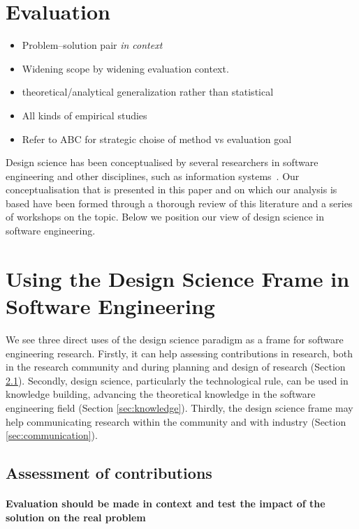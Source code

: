 \documentclass[graybox]{svmult}
\begin{document}
\section{Evaluation}
\begin{itemize}
\item Problem--solution pair \emph{in context}
\item Widening scope by widening evaluation context. 
\item theoretical/analytical generalization rather than statistical 
\item All kinds of empirical studies \cite{easterbrook_selecting_2008}\cite{Runeson12Case,WohlinExpBook12}
\item Refer to ABC \cite{StolABC18} for strategic choise of method vs evaluation goal
\end{itemize}



Design science has been conceptualised by several researchers in software engineering and other disciplines, such as information systems~\cite{gregor_positioning_2013}. Our conceptualisation that is presented in this paper and on which our analysis is based have been formed through a thorough review of this literature and a series of workshops on the topic. Below we position our view of design science in software engineering.



\section{Using the Design Science Frame in Software Engineering}
We see three direct uses of the design science paradigm as a frame for software engineering research. Firstly, it can help assessing contributions in research, both in the research community and during planning and design of research (Section \ref{sec:assessment}). Secondly, design science, particularly the technological rule, can be used in knowledge building, advancing the theoretical knowledge in the software engineering field (Section \ref{sec:knowledge}). Thirdly, the design science frame may help communicating research within the community and with industry (Section \ref{sec:communication}).

\subsection{Assessment of contributions}
\label{sec:assessment}
\paragraph{Evaluation should be made in context and test the impact of the solution on the real problem}
\end{document}
